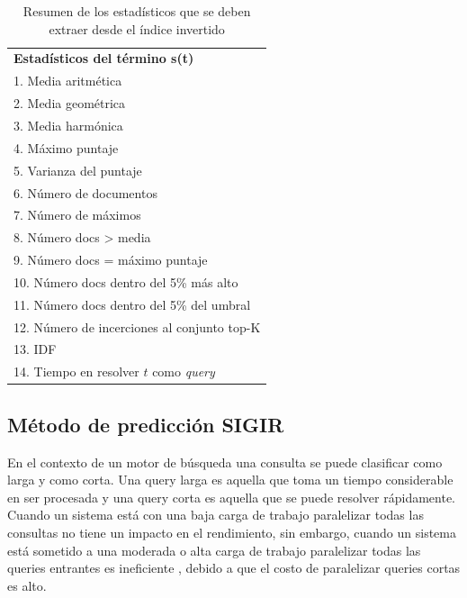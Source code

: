 \begin{table}[H]
\centering
\caption{Resumen de los estadísticos que se deben extraer desde el índice invertido}
\label{tabla:estadisticosGlasgow}
\begin{tabular}{|l|}
	\hline
	\textbf{Estadísticos del término s(t)} \\	
	1. Media aritmética	 \\ \hline
	2. Media geométrica	 \\ \hline
	3. Media harmónica	 \\ \hline
	4. Máximo puntaje	 \\ \hline
	5. Varianza del puntaje	 \\ \hline
	6. Número de documentos	 \\ \hline
	7. Número de máximos	 \\ \hline
	8. Número docs > media	 \\ \hline
	9. Número docs = máximo puntaje	 \\ \hline
	10. Número docs dentro del 5\% más alto	 \\ \hline
	11. Número docs dentro del 5\% del umbral	 \\ \hline
	12. Número de incerciones al conjunto top-K	 \\ \hline
	13. IDF	 \\ \hline
	14. Tiempo en resolver $t$ como \textit{query}	\\ \hline  
\end{tabular}
\end{table}


\subsection{Método de predicción SIGIR}
\label{scheduling:sigir}
En el contexto de un motor de búsqueda una consulta se puede clasificar como larga y como corta. Una query larga es aquella que toma un tiempo considerable en ser procesada y una query corta es aquella que se puede resolver rápidamente. Cuando un sistema está con una baja carga de trabajo paralelizar todas las consultas no tiene un impacto en el rendimiento, sin embargo, cuando un sistema está sometido a una moderada o alta carga de trabajo paralelizar todas las queries entrantes es ineficiente  \citep{Jeon:2014}, debido a que el costo de paralelizar queries cortas es alto. %





